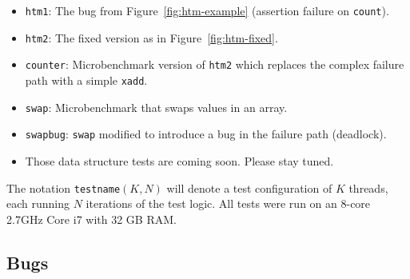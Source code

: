 \documentclass[10pt]{sigplanconf}
\begin{document}
\begin{itemize}
	\item {\tt htm1}: The bug from Figure~\ref{fig:htm-example} (assertion failure on {\tt count}).
	\item {\tt htm2}: The fixed version as in Figure~\ref{fig:htm-fixed}.
	\item {\tt counter}: Microbenchmark version of {\tt htm2} which replaces the complex failure path with a simple {\tt xadd}.
	\item {\tt swap}: Microbenchmark that swaps values in an array.
	\item {\tt swapbug}: {\tt swap} modified to introduce a bug in the failure path (deadlock).
	\item Those data structure tests are coming soon. Please stay tuned.
\end{itemize}

The notation {\tt testname}$(K,N)$ will denote a test configuration of $K$ threads, each running $N$ iterations of the test logic.
All tests were run on an 8-core 2.7GHz Core i7 with 32 GB RAM.

\subsection{Bugs}
\end{document}
